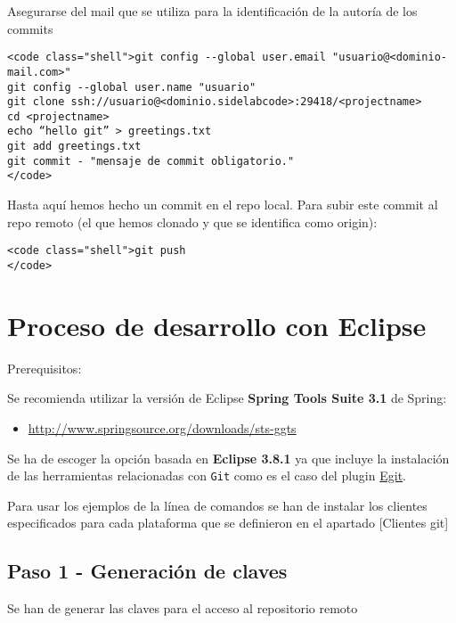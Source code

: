 Asegurarse del mail que se utiliza para la identificación de la autoría
de los commits

\begin{quote}

\end{quote}
\begin{verbatim}
<code class="shell">git config --global user.email "usuario@<dominio-mail.com>"
git config --global user.name "usuario"
git clone ssh://usuario@<dominio.sidelabcode>:29418/<projectname>
cd <projectname>
echo “hello git” > greetings.txt
git add greetings.txt
git commit - "mensaje de commit obligatorio."
</code>
\end{verbatim}
Hasta aquí hemos hecho un commit en el repo local. Para subir este
commit al repo remoto (el que hemos clonado y que se identifica como
origin):

\begin{quote}

\end{quote}
\begin{verbatim}
<code class="shell">git push
</code>
\end{verbatim}
\section{Proceso de desarrollo con Eclipse}

Prerequisitos:

Se recomienda utilizar la versión de Eclipse \textbf{Spring Tools Suite
3.1} de Spring:

\begin{itemize}
\item
  \href{http://www.springsource.org/downloads/sts-ggts}{http://www.springsource.org/downloads/sts-ggts}
\end{itemize}
Se ha de escoger la opción basada en \textbf{Eclipse 3.8.1} ya que
incluye la instalación de las herramientas relacionadas con \texttt{Git}
como es el caso del plugin \href{http://www.eclipse.org/egit/}{Egit}.

Para usar los ejemplos de la línea de comandos se han de instalar los
clientes especificados para cada plataforma que se definieron en el
apartado {[}Clientes git{]}

\subsection{Paso 1 - Generación de claves}

Se han de generar las claves para el acceso al repositorio remoto

